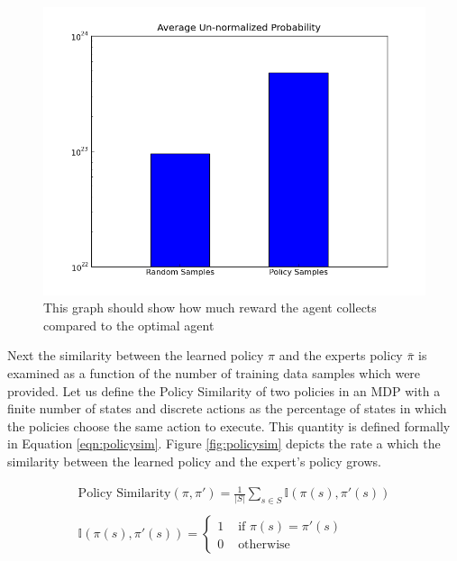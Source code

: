 \documentclass{article} %
\begin{document}
\begin{figure}
  \centering
  \includegraphics[width=.7\textwidth]{figures/graph.png}
  \caption{This graph should show how much reward the agent collects compared to the optimal agent}
  \label{fig:reward}
\end{figure}


Next the similarity between the learned policy $\pi$ and the experts policy $\bar{\pi}$ is examined as a function of the number of training data samples which were provided. Let us define the Policy Similarity of two policies in an MDP with a finite number of states and discrete actions as the percentage of states in which the policies choose the same action to execute. This quantity is defined formally in Equation \ref{eqn:policysim}. Figure \ref{fig:policysim} depicts the rate a which the similarity between the learned policy and the expert's policy grows.

\begin{equation}
\begin{array}{l}
\textrm{Policy Similarity}(\pi,\pi') = \frac{1}{|S|}\sum_{s \in S} \mathbb{I}(\pi(s),\pi'(s)) \\
\\
\mathbb{I}(\pi(s),\pi'(s)) = \left\{ \begin{array}{rl}
 1 &\mbox{ if $\pi(s) = \pi'(s)$} \\
 0 &\mbox{ otherwise}
\end{array} \right. \\
\end{array}
\label{eqn:policysim}
\end{equation}
\end{document}
